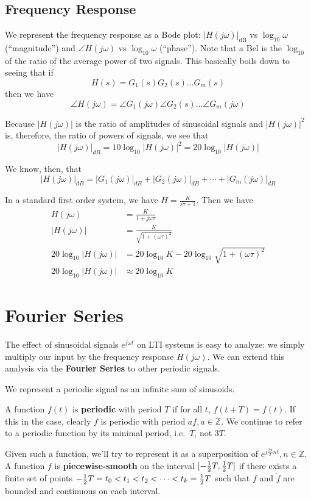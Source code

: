 \documentclass[12pt]{article}
\begin{document}
\subsection{Frequency Response}
We represent the frequency response as a Bode plot: $|H(j\omega)|_{\text{dB}}$ vs $\log_{10} \omega$ (``magnitude'') and $\angle H(j\omega)$ vs $\log_{10} \omega$ (``phase''). Note that a Bel is the $\log_{10}$ of the ratio of the average power of two signals. This basically boils down to seeing that if \[ H(s) = G_1(s)G_2(s)\dots G_m(s) \] then we have \[ \angle H(j\omega) = \angle G_1(j\omega) \angle G_2(s) \dots \angle G_m(j\omega) \]

Because $|H(j\omega)|$ is the ratio of amplitudes of sinusoidal signals and $|H(j\omega)|^2$ is, therefore, the ratio of powers of signals, we see that \[ |H(j\omega)|_{dB} = 10 \log_{10} |H(j\omega)|^2 = 20 \log_{10} |H(j\omega)| \]

We know, then, that \[ |H(j\omega)|_{dB} = |G_1(j\omega)|_{dB} + |G_2(j\omega)|_{dB} + \cdots + |G_m(j\omega)|_{dB} \]

In a standard first order system, we have $H = \frac{K}{s\tau + 1}$. Then we have
\begin{align*}
H(j\omega) &= \frac{K}{1 + j\omega\tau}\\
|H(j\omega)| &= \frac{K}{\sqrt{1 + {(\omega\tau)}^2}}\\
20\log_{10}|H(j\omega)| &= 20\log_{10} K - 20\log_{10} \sqrt{1+{(\omega\tau)}^2}\\
20\log_{10}|H(j\omega)| &\approx 20\log_{10} K
\end{align*}

\section{Fourier Series}
The effect of sinusoidal signals $e^{j\omega t}$ on LTI systems is easy to analyze: we simply multiply our input by the frequency response $H(j\omega)$. We can extend this analysis via the {\bf Fourier Series} to other periodic signals.

We represent a periodic signal as an infinite sum of sinusoids.

A function $f(t)$ is {\bf periodic} with period $T$ if for all $t$, $f(t+T) = f(t)$. If this in the case, clearly $f$ is periodic with period $af, a \in \mathbb{Z}$. We continue to refer to a periodic function by its minimal period, i.e.\ $T$, not $3T$.

Given such a function, we'll try to represent it as a superposition of $e^{j\frac{2\pi}{T}nt}, n \in \mathbb{Z}$. A function $f$ is {\bf piecewise-smooth} on the interval $[-\frac{1}{2} T, \frac{1}{2} T]$ if there exists a finite set of points $-\frac{1}{2} T = t_0 < t_1 < t_2 < \cdots < t_k = \frac{1}{2} T$ such that $f$ and $\dot f$ are bounded and continuous on each interval.
\end{document}
